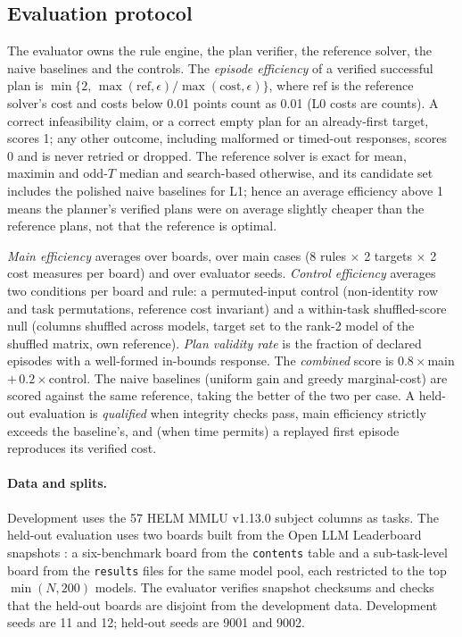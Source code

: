 \documentclass{article}
\begin{document}
\subsection{Evaluation protocol}\label{sec:protocol}
The evaluator owns the rule engine, the plan verifier, the reference solver, the naive baselines and the controls. The \emph{episode efficiency} of a verified successful plan is $\min\{2,\,\max(\mathrm{ref},\epsilon)/\max(\mathrm{cost},\epsilon)\}$, where $\mathrm{ref}$ is the reference solver's cost and costs below 0.01 points count as 0.01 (L0 costs are counts). A correct infeasibility claim, or a correct empty plan for an already-first target, scores 1; any other outcome, including malformed or timed-out responses, scores 0 and is never retried or dropped. The reference solver is exact for mean, maximin and odd-$T$ median and search-based otherwise, and its candidate set includes the polished naive baselines for L1; hence an average efficiency above 1 means the planner's verified plans were on average slightly cheaper than the reference plans, not that the reference is optimal.

\emph{Main efficiency} averages over boards, over main cases (8 rules $\times$ 2 targets $\times$ 2 cost measures per board) and over evaluator seeds. \emph{Control efficiency} averages two conditions per board and rule: a permuted-input control (non-identity row and task permutations, reference cost invariant) and a within-task shuffled-score null (columns shuffled across models, target set to the rank-2 model of the shuffled matrix, own reference). \emph{Plan validity rate} is the fraction of declared episodes with a well-formed in-bounds response. The \emph{combined} score is $0.8\times$main $+\,0.2\times$control. The naive baselines (uniform gain and greedy marginal-cost) are scored against the same reference, taking the better of the two per case. A held-out evaluation is \emph{qualified} when integrity checks pass, main efficiency strictly exceeds the baseline's, and (when time permits) a replayed first episode reproduces its verified cost.

\paragraph{Data and splits.} Development uses the 57 HELM MMLU v1.13.0 subject columns as tasks. The held-out evaluation uses two boards built from the Open LLM Leaderboard snapshots \citep{OpenLLMLeaderboardContents2025}: a six-benchmark board from the \texttt{contents} table and a sub-task-level board from the \texttt{results} files for the same model pool, each restricted to the top $\min(N,200)$ models. The evaluator verifies snapshot checksums and checks that the held-out boards are disjoint from the development data. Development seeds are 11 and 12; held-out seeds are 9001 and 9002.
\end{document}
